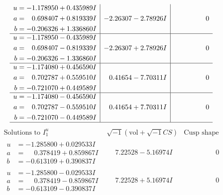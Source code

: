 \documentclass[1p]{elsarticle_modified}
\theoremstyle{definition}
\newcommand{\I}{\sqrt{-1}}
\begin{document}
$$\begin{array}{c|c|c}
\begin{aligned}
u &= -1.178950 + 0.435989 I \\
a &= \phantom{-}0.698407 + 0.819339 I \\
b &= -0.206326 + 1.336860 I\end{aligned}
 & -2.26307 - 2.78926 I & \phantom{-0.000000 } 0 \\ \hline\begin{aligned}
u &= -1.178950 - 0.435989 I \\
a &= \phantom{-}0.698407 - 0.819339 I \\
b &= -0.206326 - 1.336860 I\end{aligned}
 & -2.26307 + 2.78926 I & \phantom{-0.000000 } 0 \\ \hline\begin{aligned}
u &= -1.174080 + 0.456590 I \\
a &= \phantom{-}0.702787 + 0.559510 I \\
b &= -0.721070 + 0.449589 I\end{aligned}
 & \phantom{-}0.41654 - 7.70311 I & \phantom{-0.000000 } 0 \\ \hline\begin{aligned}
u &= -1.174080 - 0.456590 I \\
a &= \phantom{-}0.702787 - 0.559510 I \\
b &= -0.721070 - 0.449589 I\end{aligned}
 & \phantom{-}0.41654 + 7.70311 I & \phantom{-0.000000 } 0\\
 \hline 
 \end{array}$$\newpage$$\begin{array}{c|c|c}  
\text{Solutions to }I^u_{1}& \I (\text{vol} + \sqrt{-1}CS) & \text{Cusp shape}\\
 \hline 
\begin{aligned}
u &= -1.285800 + 0.029533 I \\
a &= \phantom{-}0.378419 + 0.859867 I \\
b &= -0.613109 + 0.390837 I\end{aligned}
 & \phantom{-}7.22528 - 5.16974 I & \phantom{-0.000000 } 0 \\ \hline\begin{aligned}
u &= -1.285800 - 0.029533 I \\
a &= \phantom{-}0.378419 - 0.859867 I \\
b &= -0.613109 - 0.390837 I\end{aligned}
 & \phantom{-}7.22528 + 5.16974 I & \phantom{-0.000000 } 0 \\ \hline\begin{aligned}

\end{aligned}
\end{array}$$
\end{document}
